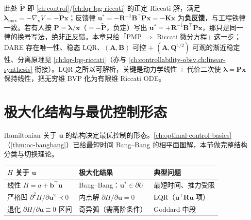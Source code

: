 \begin{note}[换算到工程约定]
此处 $\tilde{\mathbf P}$ 即 \cref{ch:control}/\cref{ch:lqr-lqg-riccati} 的正定 Riccati 解，满足 $\boldsymbol\lambda_{\max}=-\nabla_{\mathbf x}V=-\tilde{\mathbf P}\mathbf x$；反馈律 $\mathbf u^\ast=-\mathbf R^{-1}\mathbf B^\top\tilde{\mathbf P}\mathbf x=-\mathbf K\mathbf x$ 为\textbf{负反馈}，与工程铁律一致。若有人按 $\mathbf P=\boldsymbol\lambda/\mathbf x$（$=-\tilde{\mathbf P}$，负定）写出 $\mathbf u^\ast=+\mathbf R^{-1}\mathbf B^\top\mathbf P\mathbf x$，那只是同一律的换号写法，绝非正反馈。本章只给「PMP $\Rightarrow$ Riccati 微分方程」这一步；DARE 存在唯一性、稳态 LQR、$(\mathbf A,\mathbf B)$ 可控 + $(\mathbf A,\mathbf Q^{1/2})$ 可观的渐近稳定性、分离原理见 \cref{ch:lqr-lqg-riccati}（亦与 \cref{ch:controllability-obsv,ch:linear-synthesis} 衔接）。LQR 之所以可解析，关键是动力学线性 + 代价二次使 $\boldsymbol\lambda=\mathbf P\mathbf x$ 保持线性，把无穷维 BVP 化为有限维 Riccati ODE。
\end{note}

\section{极大化结构与最优控制形态}
\label{sec:pmp-bangbang}

Hamiltonian 关于 $\mathbf u$ 的结构决定最优控制的形态。\cref{ch:optimal-control-basics}（\cref{thm:oc-bangbang}）已给最短时间 Bang--Bang 的相平面图解，本节做完整结构分类与切换理论。

\begin{center}\small
\begin{tabular}{lll}
\toprule
$H$ 关于 $\mathbf u$ & 极大化结果 & 典型问题\\
\midrule
线性 $H=a+\mathbf b^\top\mathbf u$ & Bang--Bang：$\mathbf u^\ast\in\partial U$ & 最短时间、推力受限\\
严格凹 $\partial^2 H/\partial\mathbf u^2\prec0$ & 内点解 $\partial H/\partial\mathbf u=0$ & LQR（$\mathbf u^\top\mathbf R\mathbf u$ 项）\\
退化 $\partial H/\partial\mathbf u\equiv0$ 区间 & 奇异弧（需高阶条件） & Goddard 中段\\
\bottomrule
\end{tabular}
\end{center}

